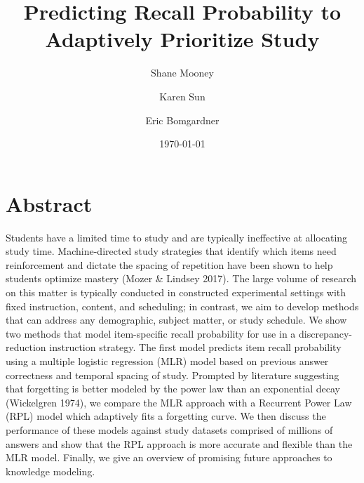 \documentclass[a4paper,12pt]{article}
\begin{document}
\title{Predicting Recall Probability to Adaptively Prioritize Study}
\author[1]{Shane Mooney}
\author[2]{Karen Sun}
\author[3]{Eric Bomgardner}
\date{\today}
\maketitle

\section{Abstract}
Students have a limited time to study and are typically ineffective at allocating study time. Machine-directed study strategies that identify which items need reinforcement and dictate the spacing of repetition have been shown to help students optimize mastery (Mozer \& Lindsey 2017). The large volume of research on this matter is typically conducted in constructed experimental settings with fixed instruction, content, and scheduling; in contrast, we aim to develop methods that can address any demographic, subject matter, or study schedule. We show two methods that model item-specific recall probability for use in a discrepancy-reduction instruction strategy. The first model predicts item recall probability using a multiple logistic regression (MLR) model based on previous answer correctness and temporal spacing of study. Prompted by literature suggesting that forgetting is better modeled by the power law than an exponential decay (Wickelgren 1974), we compare the MLR approach with a Recurrent Power Law (RPL) model which adaptively fits a forgetting curve. We then discuss the performance of these models against study datasets comprised of millions of answers and show that the RPL approach is more accurate and flexible than the MLR model. Finally, we give an overview of promising future approaches to knowledge modeling.
\end{document}
